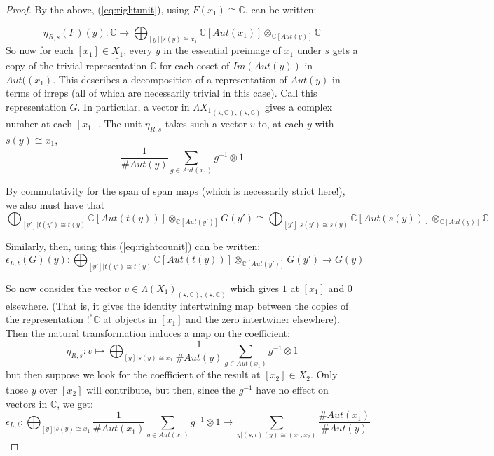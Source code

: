 \documentclass[10pt]{amsart}
\numberwithin{theorem}{subsection}
\newcommand{\ra}{\mathop{\rightarrow}}
\newcommand{\FV}{\Lambda}
\begin{document}
\begin{proof}
By the above, (\ref{eq:rightunit}), using $F(x_1) \cong \mathbb{C}$, can
be written:

\begin{equation}
\eta_{R,s}(F)(y) : \mathbb{C} \ra \bigoplus_{[y] | s(y) \cong x_1} \mathbb{C}[Aut(x_1)] \otimes_{\mathbb{C}[Aut(y)]} \mathbb{C}
\end{equation}
So now for each $[x_1] \in \underline{X_1}$, every $y$ in the
essential preimage of $x_1$ under $s$ gets a copy of the trivial
representation $\mathbb{C}$ for each coset of $Im(Aut(y))$ in
$Aut((x_1)$.  This describes a decomposition of a representation of
$Aut(y)$ in terms of irreps (all of which are necessarily trivial in
this case).  Call this representation $G$.  In particular, a vector in
$\FV{X_1}_{(\star,\mathbb{C}),(\star,\mathbb{C})}$ gives a complex
number at each $[x_1]$.  The unit $\eta_{R,s}$ takes such a vector $v$
to, at each $y$ with $s(y) \cong x_1$,
\begin{equation}
\frac{1}{\# Aut(y)} \sum_{g \in Aut(x_1)} g^{-1} \otimes 1
\end{equation}

By commutativity for the span of span maps (which is necessarily
strict here!), we also must have that
\begin{equation}
\bigoplus_{[y'] | t(y') \cong t(y)} \mathbb{C}[Aut(t(y))] \otimes_{\mathbb{C}[Aut(y')]}G(y') \cong \bigoplus_{[y'] | s(y') \cong s(y)} \mathbb{C}[Aut(s(y))] \otimes_{\mathbb{C}[Aut(y)]}\mathbb{C}
\end{equation}

Similarly, then, using this  (\ref{eq:rightcounit}) can be written:
\begin{equation}
\epsilon_{L,t}(G)(y) : \bigoplus_{[y'] | t(y') \cong t(y)} \mathbb{C}[Aut(t(y))] \otimes_{\mathbb{C}[Aut(y')]}G(y') \ra G(y)
\end{equation}

So now consider the vector $v \in
\FV(X_1)_{(\star,\mathbb{C}),(\star,\mathbb{C})}$ which gives $1$ at
$[x_1]$ and $0$ elsewhere.  (That is, it gives the identity
intertwining map between the copies of the representation
$!^{\ast}\mathbb{C}$ at objects in $[x_1]$ and the zero intertwiner
elsewhere).  Then the natural transformation induces a map on the
coefficient:
\begin{equation}
\eta_{R,s}: v \mapsto \bigoplus_{[y] | s(y) \cong x_1} \frac{1}{\# Aut(y)} \sum_{g \in Aut(x_1)} g^{-1} \otimes 1
\end{equation}
but then suppose we look for the coefficient of the result at $[x_2]
\in \underline{X_2}$.  Only those $y$ over $[x_2]$ will contribute, but
then, since the $g^{-1}$ have no effect on vectors in $\mathbb{C}$, we get:
\begin{equation}
\epsilon_{L,t} : \bigoplus_{[y] | s(y) \cong x_1} \frac{1}{\# Aut(x_1)} \sum_{g \in Aut(x_1)} g^{-1} \otimes 1 \mapsto \sum_{y | (s,t)(y) \cong (x_1,x_2)} \frac{\# Aut(x_1)}{\# Aut(y)}
\end{equation}


\end{proof}
\end{document}
